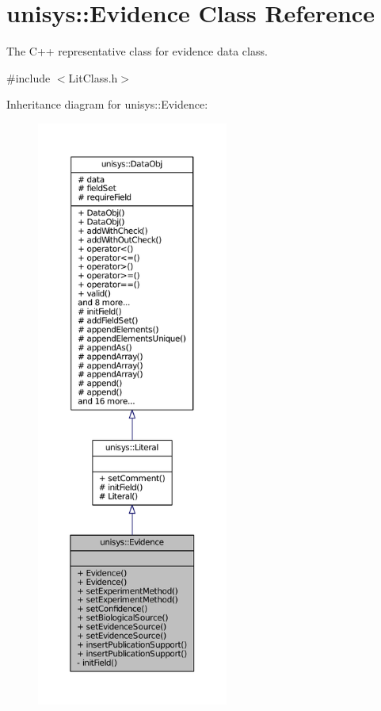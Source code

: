 \hypertarget{classunisys_1_1Evidence}{\section{unisys\-:\-:Evidence Class Reference}
\label{classunisys_1_1Evidence}
}


The C++ representative class for evidence data class.  




{\ttfamily \#include $<$Lit\-Class.\-h$>$}



Inheritance diagram for unisys\-:\-:Evidence\-:
\nopagebreak
\begin{figure}[H]
\begin{center}
\leavevmode
\includegraphics[height=550pt]{classunisys_1_1Evidence__inherit__graph}
\end{center}
\end{figure}


